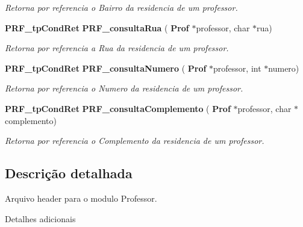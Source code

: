\begin{Indent}
\begin{DoxyCompactItemize}
\begin{DoxyCompactList}\small\item\em Retorna por referencia o Bairro da residencia de um professor. \end{DoxyCompactList}\item 
\textbf{ P\+R\+F\+\_\+tp\+Cond\+Ret} \textbf{ P\+R\+F\+\_\+consulta\+Rua} (\textbf{ Prof} $\ast$professor, char $\ast$rua)
\begin{DoxyCompactList}\small\item\em Retorna por referencia a Rua da residencia de um professor. \end{DoxyCompactList}\item 
\textbf{ P\+R\+F\+\_\+tp\+Cond\+Ret} \textbf{ P\+R\+F\+\_\+consulta\+Numero} (\textbf{ Prof} $\ast$professor, int $\ast$numero)
\begin{DoxyCompactList}\small\item\em Retorna por referencia o Numero da residencia de um professor. \end{DoxyCompactList}\item 
\textbf{ P\+R\+F\+\_\+tp\+Cond\+Ret} \textbf{ P\+R\+F\+\_\+consulta\+Complemento} (\textbf{ Prof} $\ast$professor, char $\ast$complemento)
\begin{DoxyCompactList}\small\item\em Retorna por referencia o Complemento da residencia de um professor. \end{DoxyCompactList}\end{DoxyCompactItemize}
\end{Indent}


\subsection{Descrição detalhada}
Arquivo header para o modulo Professor. 

Detalhes adicionais 
